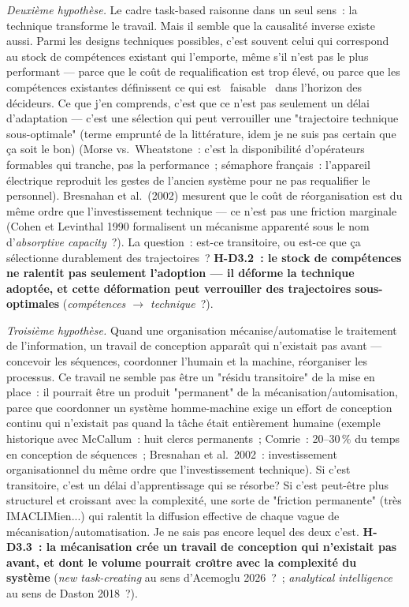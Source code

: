 \emph{Deuxi\`eme hypoth\`ese.} Le cadre task-based raisonne dans un seul sens~: la technique transforme le travail. Mais il semble que la causalit\'e inverse existe aussi. Parmi les designs techniques possibles, c'est souvent celui qui correspond au stock de comp\'etences existant qui l'emporte, m\^eme s'il n'est pas le plus performant --- parce que le co\^ut de requalification est trop \'elev\'e, ou parce que les comp\'etences existantes d\'efinissent ce qui est \og~faisable~\fg{} dans l'horizon des d\'ecideurs. Ce que j'en comprends, c'est que ce n'est pas seulement un d\'elai d'adaptation --- c'est une s\'election qui peut verrouiller une "trajectoire technique sous-optimale" (terme emprunté de la littérature, idem je ne suis pas certain que ça soit le bon) (Morse vs.\ Wheatstone~: c'est la disponibilit\'e d'op\'erateurs formables qui tranche, pas la performance~; s\'emaphore fran\c{c}ais~: l'appareil \'electrique reproduit les gestes de l'ancien syst\`eme pour ne pas requalifier le personnel). Bresnahan et al.~(2002) mesurent que le co\^ut de r\'eorganisation est du m\^eme ordre que l'investissement technique --- ce n'est pas une friction marginale (Cohen et Levinthal 1990 formalisent un m\'ecanisme apparent\'e sous le nom d'\emph{absorptive capacity}~?). La question~: est-ce transitoire, ou est-ce que \c{c}a s\'electionne durablement des trajectoires~? \textbf{H-D3.2~: le stock de comp\'etences ne ralentit pas seulement l'adoption --- il d\'eforme la technique adopt\'ee, et cette d\'eformation peut verrouiller des trajectoires sous-optimales} (\emph{comp\'etences $\to$ technique}~?).

\emph{Troisi\`eme hypoth\`ese.} Quand une organisation m\'ecanise/automatise le traitement de l'information, un travail de conception appara\^{\i}t qui n'existait pas avant --- concevoir les s\'equences, coordonner l'humain et la machine, r\'eorganiser les processus. Ce travail ne semble pas \^etre un "r\'esidu transitoire" de la mise en place~: il pourrait \^etre un produit "permanent" de la m\'ecanisation/automisation, parce que coordonner un syst\`eme homme-machine exige un effort de conception continu qui n'existait pas quand la t\^ache \'etait enti\`erement humaine (exemple historique avec McCallum~: huit clercs permanents~; Comrie~: 20--30\,\% du temps en conception de s\'equences~; Bresnahan et al.\ 2002~: investissement organisationnel du m\^eme ordre que l'investissement technique). Si c'est transitoire, c'est un d\'elai d'apprentissage qui se r\'esorbe? Si c'est peut-être plus structurel et croissant avec la complexit\'e, une sorte de "friction permanente" (très IMACLIMien...) qui ralentit la diffusion effective de chaque vague de m\'ecanisation/automatisation. Je ne sais pas encore lequel des deux c'est. \textbf{H-D3.3~: la m\'ecanisation cr\'ee un travail de conception qui n'existait pas avant, et dont le volume pourrait cro\^{\i}tre avec la complexit\'e du syst\`eme} (\emph{new task-creating} au sens d'Acemoglu 2026~?~; \emph{analytical intelligence} au sens de Daston 2018~?).

